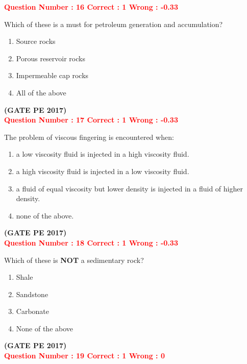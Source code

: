 \documentclass[12pt]{article}
\begin{document}
{\textcolor{red}{\textbf{Question Number : 16 \hfill Correct : 1  Wrong : -0.33}}

Which of these is a must for petroleum generation and accumulation?

\begin{enumerate}[label=(\Alph*)]
    \item Source rocks
    \item Porous reservoir rocks
    \item Impermeable cap rocks
    \item All of the above
\end{enumerate}

\hfill\textbf{(GATE PE 2017)}\\[0.6cm]

\textcolor{red}{\textbf{Question Number : 17 \hfill Correct : 1  Wrong : -0.33}}

The problem of viscous fingering is encountered when:

\begin{enumerate}[label=(\Alph*)]
    \item a low viscosity fluid is injected in a high viscosity fluid.
    \item a high viscosity fluid is injected in a low viscosity fluid.
    \item a fluid of equal viscosity but lower density is injected in a fluid of higher density.
    \item none of the above.
\end{enumerate}

\hfill\textbf{(GATE PE 2017)}\\[0.6cm]

\textcolor{red}{\textbf{Question Number : 18 \hfill Correct : 1  Wrong : -0.33}}

Which of these is \textbf{NOT} a sedimentary rock?

\begin{enumerate}[label=(\Alph*)]
    \item Shale
    \item Sandstone
    \item Carbonate
    \item None of the above
\end{enumerate}

\hfill\textbf{(GATE PE 2017)}\\[0.6cm]


\textcolor{red}{\textbf{Question Number : 19 \hfill Correct : 1  Wrong : 0}}

}
\end{document}
